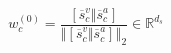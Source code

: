 \begin{equation}
\label{eq:initial-class-embedding}
{w}_{c}^{(0)}=\frac{\left[ {\overline{s}}_{c}^{v}\Vert {\overline{s}}_{c}^{a}\right] }{{\left\Vert \left[ {\overline{s}}_{c}^{v}\Vert {\overline{s}}_{c}^{a}\right] \right\Vert }_{2}}\in {\mathbb{R}}^{{d}_{s}}
\end{equation}
